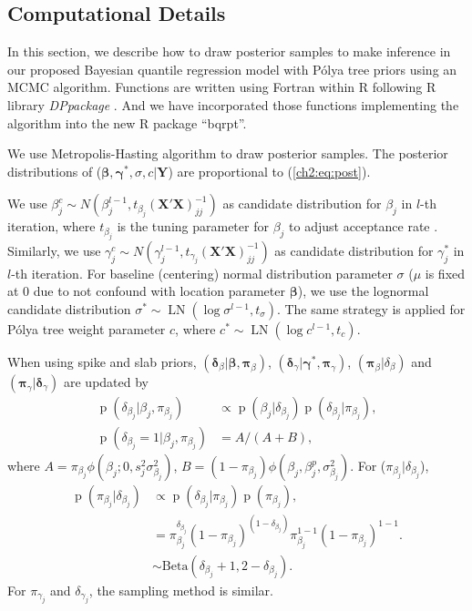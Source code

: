 \documentclass[12pt]{article}
\newcommand{\polya}{P\'{o}lya}
\DeclareMathOperator{\pr}{p}
\DeclareMathOperator{\LN}{LN}
\begin{document}
\subsection{Computational Details}\label{ch2:sec:computation}

In this section, we describe how to draw posterior samples to make
inference in our proposed Bayesian quantile regression model with
\polya{} tree priors using an MCMC algorithm. Functions are written
using Fortran within R \citep{R} following R library
\textit{DPpackage} \citep{DPpackage}. And we have incorporated those
functions implementing the algorithm into the new R \citep{R} package
``bqrpt''.

We use Metropolis-Hasting algorithm to draw posterior samples. The
posterior distributions of ($\bm \beta, \bm \gamma^{*}, \sigma, c | \bm
Y$) are proportional to (\ref{ch2:eq:post}).

We use $\beta_j^c \sim N(\beta_j^{l-1}, t_{\beta_j}
(\bm{X'X})^{-1}_{jj})$ as candidate distribution for $\beta_j$ in
$l$-th iteration, where $t_{\beta_j}$ is the tuning parameter for
$\beta_j$ to adjust acceptance rate \citep{jara2009}.  Similarly, we
use $\gamma_j^c \sim N(\gamma_j^{l-1},
t_{\gamma_j}(\bm{X'X})^{-1}_{jj})$ as candidate distribution for
$\gamma_j^{*}$ in $l$-th iteration.  For baseline (centering) normal
distribution parameter $\sigma$ ($\mu$ is fixed at 0 due to not
confound with location parameter $\bm \beta$), we use the lognormal
candidate distribution $\sigma^* \sim \LN(\log \sigma^{l-1},
t_{\sigma})$. The same strategy is applied for \polya{} tree weight
parameter $c$, where $c^* \sim \LN(\log c^{l-1}, t_c)$.

When using spike and slab priors,
$(\bm \delta_{\beta}|\bm \beta, \bm \pi_{\beta})$, $(\bm \delta_{\gamma}|\bm
\gamma^{*}, \bm \pi_{\gamma})$, $(\bm \pi_{\beta}|\delta_{\beta})$ and
$(\bm \pi_{\gamma}|\bm \delta_{\gamma})$ are updated by
\begin{align*}
  \pr(\delta_{\beta_j}|\beta_j, \pi_{\beta_j}) & \propto \pr(\beta_j |
  \delta_{\beta_j})
  \pr(\delta_{\beta_j}|\pi_{\beta_j}) ,\\
  \pr(\delta_{\beta_j} = 1|\beta_j, \pi_{\beta_j})& = A/(A + B),
\end{align*}
where $A = \pi_{\beta_j}\phi (\beta_j;0, s_j^2\sigma_{\beta_j}^2)$, $B
= (1-\pi_{\beta_j})\phi(\beta_j, \beta_j^p, \sigma_{\beta_j}^2)$.  For
($\pi_{\beta_j}|\delta_{\beta_j}$),
\begin{align*}
  \pr(\pi_{\beta_j}| \delta_{\beta_j}) & \propto \pr(\delta_{\beta_j}|\pi_{\beta_j}) \pr(\pi_{\beta_j}) ,\\
  & = \pi_{\beta_j}^{\delta_{\beta_j}} (1 - \pi_{\beta_j})^{(1 -
    \delta_{\beta_j})}
  \pi_{\beta_j}^{1 - 1}(1 - \pi_{\beta_j})^{1-1}.\\
  & \sim \mbox{Beta}(\delta_{\beta_j} + 1, 2 - \delta_{\beta_j}).
\end{align*}
For $\pi_{\gamma_j}$ and $\delta_{\gamma_j}$, the sampling method is
similar.
\end{document}
